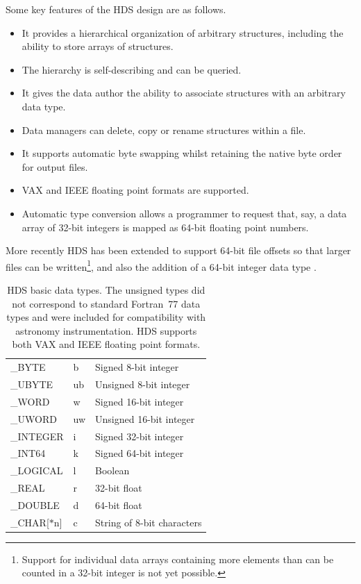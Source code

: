 \documentclass[final,authoryear,5p,times,twocolumn]{elsarticle}
\begin{document}
Some key features of the HDS design are as follows.
\begin{itemize}
\item It provides a hierarchical organization of arbitrary structures, including the
  ability to store arrays of structures.
\item The hierarchy is self-describing and can be queried.
\item It gives the data author the ability to associate structures with an arbitrary data type.
\item Data managers can delete, copy or rename structures within a file.
\item It supports automatic byte swapping whilst retaining the native byte order
  for output files.
\item VAX and IEEE floating point formats are supported.
\item Automatic type conversion allows a programmer to request that,
  say, a data array of 32-bit integers is mapped as 64-bit floating
  point numbers.
\end{itemize}

More recently HDS has been extended to support 64-bit file offsets so
that larger files can be written\footnote{Support for individual data
arrays containing more elements than can be counted in a 32-bit
integer is not yet possible.}, and also the
addition of a 64-bit integer data type \citep{P82_adassxxiii}.

\begin{table}
\caption{HDS basic data types. The unsigned types did not correspond
  to standard Fortran~77 data types and were included for
  compatibility with astronomy instrumentation. HDS supports both VAX
  and IEEE floating point formats.}
\label{tab:hdstypes}
\begin{center}
\begin{tabular}{lll}
\hline
\_BYTE & b & Signed 8-bit integer \\
\_UBYTE & ub & Unsigned 8-bit integer \\
\_WORD & w & Signed 16-bit integer \\
\_UWORD & uw & Unsigned 16-bit integer \\
\_INTEGER & i & Signed 32-bit integer \\
\_INT64 & k &Signed 64-bit integer \\
\_LOGICAL & l & Boolean \\
\_REAL & r & 32-bit float \\
\_DOUBLE & d & 64-bit float \\
\_CHAR[$*$n] & c & String of 8-bit characters \\
\hline
\end{tabular}
\end{center}
\end{table}
\end{document}

